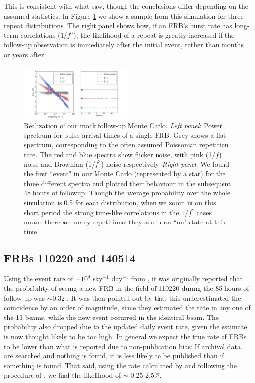 \documentclass[useAMS,usenatbib]{mn2e}
\begin{document}
This is consistent with what \cite{2015MNRAS.454..457P} saw, though the 
conclusions differ depending on the assumed statistics. In Figure \ref{FIG-RATE}
we show a sample from this simulation for three repeat distributions. The right panel 
shows how, if an FRB's burst rate has long-term correlations (1$/f^\gamma$), 
the likelihood of a repeat is greatly increased if the follow-up observation is 
immediately after the initial event, rather than months or years after. 


\begin{figure}
  \centering
   \includegraphics[trim={.5in, 0in, .5in, 0in}, width=0.5\textwidth, height=0.27\textwidth]{frb_sim_pink24.png}
   \caption{Realization of our mock follow-up Monte Carlo. \textit{Left panel}: Power spectrum for pulse arrival times of a single FRB.
   Grey shows a flat spectrum, corresponding to the often assumed Poissonian 
   repetition rate. The red and blue spectra show flicker noise, with pink (1/$f$) 
   noise and Brownian (1/$f^2$) noise respectively. \textit{Right panel}: 
   We found the first ``event" in our Monte Carlo (represented by a star) for the three different spectra 
   and plotted their behaviour in the subsequent 48 hours of followup. Though the average
   probability over the whole simulation is 0.5 for each distribution, when we zoom in 
   on this short period the strong time-like correlations 
   in the $1/f^\gamma$ cases means there are many repetitions: they are in an ``on" state at this time.}
   \label{FIG-RATE}
\end{figure}


\subsection{FRBs 110220 and 140514}
Using the event rate of $\sim10^4$ sky$^{-1}$ day$^{-1}$
from \cite{2013Sci...341...53T}, it 
was originally reported that the probability of seeing a 
new FRB in the field of 110220 during the 85 hours of follow-up 
was $\sim$0.32  
\citep{2015MNRAS.447..246P}. It was then pointed out by \cite{2015arXiv150701002M} 
that this underestimated the coincidence by an order of magnitude, 
since they estimated the rate in any one of the 13 beams, 
while the new event occurred in the identical beam.
The probability also dropped due to the updated daily event rate,
given the \cite{2013Sci...341...53T} estimate is now thought likely to be too high. 
In general we expect the true rate of FRBs to be lower than what is 
reported due to non-publication bias: If archival data are searched and 
nothing is found, it is less likely to be published than if something is found. 
That said, using the rate calculated by \cite{2015arXiv150500834R} and following
the procedure of \cite{2015arXiv150701002M}, we find the likelihood of 
$\sim$ 0.25-2.5$\%$.
\end{document}

